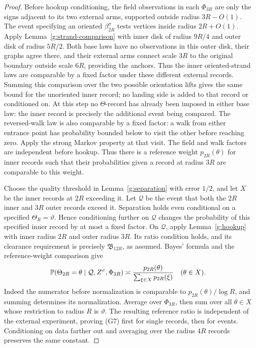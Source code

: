 \begin{proof}
Before hookup conditioning, the field observations in each
\(\Phi_{3R}\) are only the signs adjacent to its two external
arms, supported outside radius \(3R-O(1)\). The event specifying
an oriented \(\beta_{2R}^\sigma\) tests vertices inside
radius \(2R+O(1)\). Apply Lemma~\ref{g:strand-comparison} with
inner disk of radius \(9R/4\) and outer disk of radius \(5R/2\).
Both base laws have no observations in this outer disk, their graphs
agree there, and their external arms connect scale \(3R\) to the
original boundary outside scale \(6R\), providing the anchors.
Thus the inner oriented-strand laws are comparable by a fixed factor
under these different external records. Summing this comparison over
the two possible orientation lifts gives the same bound for the
unoriented inner record; no landing side is added to that record or
conditioned on. At this step no
\(\Theta\)-record has already been imposed in either base law:
the inner record is precisely the additional event being compared.
The reversed-walk law is also comparable by a
fixed factor: a walk from either entrance point has probability
bounded below to visit the other before reaching zero. Apply the
strong Markov property at that visit. The field and walk factors
are independent before hookup. Thus there is a reference weight
\(p_{2R}(\theta)\) for inner records such that their probabilities
given a record at radius \(3R\) are comparable to this weight.

Choose the quality threshold in Lemma~\ref{g:separation} with error
\(1/2\), and let \(X\) be the inner records at \(2R\) exceeding it.
Let \(\mathcal Q\) be the event that both the \(2R\) inner and
\(3R\) outer records exceed it. Separation holds even conditional
on a specified \(\Theta_R=\vartheta\). Hence conditioning further
on \(\mathcal Q\) changes the probability of this specified inner
record by at most a fixed factor. On \(\mathcal Q\), apply
Lemma~\ref{g:hookup} with inner radius \(2R\) and outer radius \(3R\).
Its ratio condition holds, and its clearance requirement is precisely
\(\mathfrak B_{12R}\), as assumed. Bayes' formula and the reference-weight
comparison give
\[
 \mathbb P(\Theta_{2R}=\theta\mid\mathcal Q,Z^\sigma,\Phi_{3R})
 \asymp \frac{p_{2R}(\theta)}{\sum_{\xi\in X}p_{2R}(\xi)}
 \quad(\theta\in X).
\]
Indeed the numerator before normalization is comparable to
\(p_{2R}(\theta)/\log R\), and summing determines its normalization.
Average over \(\Phi_{3R}\), then sum over all \(\theta\in X\)
whose restriction to radius \(R\) is \(\vartheta\).
The resulting reference ratio is independent of the external
experiment, proving (G7) first for single records, then for events.
Conditioning on data farther out and averaging over the radius
\(4R\) records preserves the same constant.
\end{proof}

